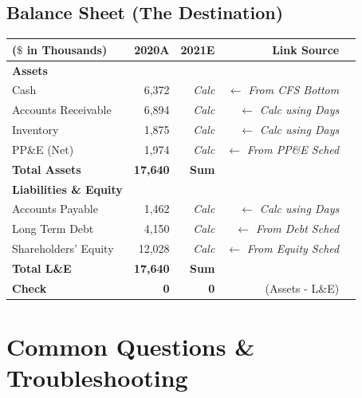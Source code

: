\documentclass[11pt, letterpaper]{article}
\begin{document}
\subsection{Balance Sheet (The Destination)}
\begin{table}[H]
\centering
\begin{tabular}{lrrrr}
\toprule
\textbf{($\$$ in Thousands)} & \textbf{2020A} & \textbf{2021E} & \textbf{Link Source} \\
\midrule
\textbf{Assets} & & & \\
Cash & 6,372 & \textit{Calc} & $\leftarrow$ \textit{From CFS Bottom} \\
Accounts Receivable & 6,894 & \textit{Calc} & $\leftarrow$ \textit{Calc using Days} \\
Inventory & 1,875 & \textit{Calc} & $\leftarrow$ \textit{Calc using Days} \\
PP\&E (Net) & 1,974 & \textit{Calc} & $\leftarrow$ \textit{From PP\&E Sched} \\
\textbf{Total Assets} & \textbf{17,640} & \textbf{Sum} & \\
\midrule
\textbf{Liabilities \& Equity} & & & \\
Accounts Payable & 1,462 & \textit{Calc} & $\leftarrow$ \textit{Calc using Days} \\
Long Term Debt & 4,150 & \textit{Calc} & $\leftarrow$ \textit{From Debt Sched} \\
Shareholders' Equity & 12,028 & \textit{Calc} & $\leftarrow$ \textit{From Equity Sched} \\
\textbf{Total L\&E} & \textbf{17,640} & \textbf{Sum} & \\
\midrule
\textbf{Check} & \textbf{0} & \textbf{0} & (Assets - L\&E) \\
\bottomrule
\end{tabular}
\end{table}

\newpage

\section{Common Questions \& Troubleshooting}
\end{document}
